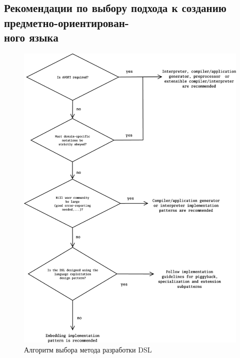 \begin{appendices}
\section{Рекомендации по выбору подхода \newline  к созданию предметно-ориентирован-\\ного языка}
\label{appendixA}

\begin{figure}[h]
\centering
\includegraphics[width=\linewidth,height=1.1\linewidth,keepaspectratio]{resources/dsl-implementation-guideline.png}
\caption{Алгоритм выбора метода разработки DSL~\cite{when-and-how-develop-dsl}}
\end{figure}

\end{appendices}
